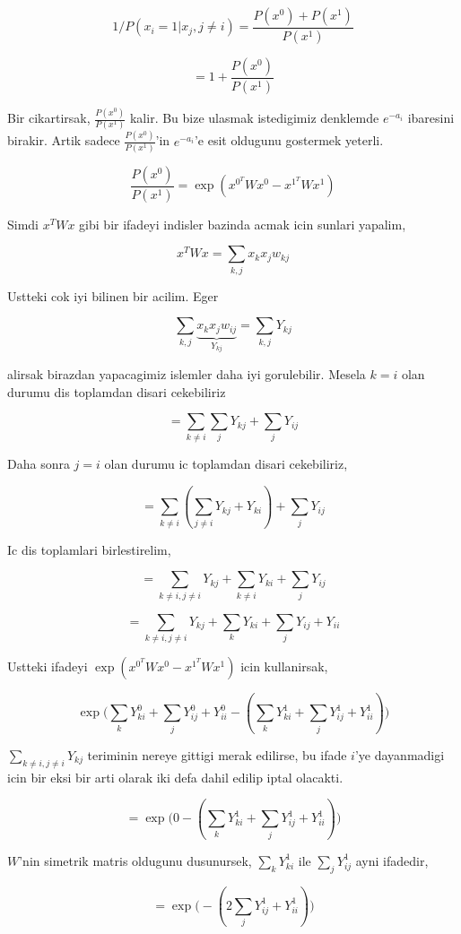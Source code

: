 \documentclass[12pt,fleqn]{article}\usepackage{../common}
\begin{document}
$$  1 / P(x_i = 1 | x_j,j \ne i) = \frac{P(x^0) + P(x^1)}{P(x^1)} 
$$

$$= 
1 + \frac{ P(x^0)}{P(x^1)}
$$

Bir cikartirsak, $\frac{ P(x^0)}{P(x^1)}$ kalir. Bu bize ulasmak
istedigimiz denklemde $e^{-a_i}$ ibaresini birakir. Artik sadece $\frac{
  P(x^0)}{P(x^1)}$'in $e^{-a_i}$'e esit oldugunu gostermek 
yeterli. 


$$ 
\frac{ P(x^0)}{P(x^1)} = \exp( x^{0^T}Wx^0 -   x^{1^T}Wx^1 )
$$

Simdi $x^TWx$ gibi bir ifadeyi indisler bazinda acmak icin sunlari yapalim, 


$$ x^TWx = \sum_{k,j} x_kx_jw_{kj} $$

Ustteki cok iyi bilinen bir acilim. Eger

$$  \sum_{k,j} \underbrace{x_kx_jw_{ij}}_{Y_{kj}} = \sum_{k,j}Y_{kj} $$

alirsak birazdan yapacagimiz islemler daha iyi gorulebilir. Mesela $k=i$
olan durumu dis toplamdan disari cekebiliriz

$$ 
= \sum_{k \ne i}\sum_j Y_{kj} + \sum_{j} Y_{ij}
$$

Daha sonra $j = i$ olan durumu ic toplamdan disari cekebiliriz, 


$$ 
= \sum_{k \ne i}( \sum_{j \ne i} Y_{kj} + Y_{ki}) + \sum_{j} Y_{ij}
$$

Ic dis toplamlari birlestirelim,


$$ 
= \sum_{k \ne i,j \ne i} Y_{kj} + \sum_{k \ne i}  Y_{ki} + \sum_{j} Y_{ij}
$$

$$ 
= \sum_{k \ne i,j \ne i} Y_{kj} + \sum_{k}  Y_{ki} + \sum_{j} Y_{ij} + Y_{ii}
$$

Ustteki ifadeyi $ \exp( x^{0^T}Wx^0 -   x^{1^T}Wx^1 )$ icin kullanirsak,

$$ 
\exp 
\big( 
\sum_{k}  Y_{ki}^0 + \sum_{j} Y_{ij}^0 + Y_{ii}^0 - 
( \sum_{k}  Y_{ki}^1 + \sum_{j} Y_{ij}^1 + Y_{ii}^1  )
\big)
 $$

$\sum_{k \ne i,j \ne i} Y_{kj}$ teriminin nereye gittigi merak edilirse,
bu ifade $i$'ye dayanmadigi icin bir eksi bir arti olarak iki defa dahil
edilip iptal olacakti. 

$$ 
= \exp \big( 
0 - ( \sum_{k}  Y_{ki}^1 + \sum_{j} Y_{ij}^1 + Y_{ii}^1  ) 
\big)
 $$

$W$'nin simetrik matris oldugunu dusunursek, $\sum_{k}  Y_{ki}^1$ ile $\sum_{j}Y_{ij}^1$ ayni ifadedir, 

$$ 
= \exp \big( 
- ( 2 \sum_{j} Y_{ij}^1 + Y_{ii}^1  ) 
\big)
 $$
\end{document}

